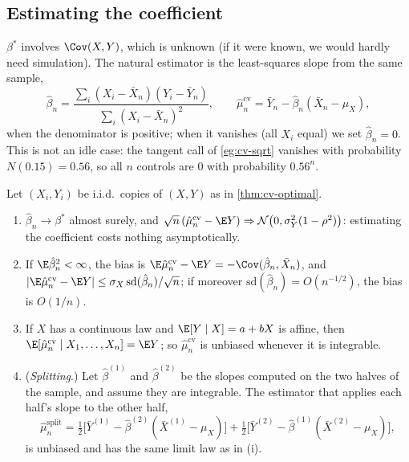 \subsection{Estimating the coefficient}

$\beta^*$ involves $\Cov(X,Y)$, which is unknown (if it were known, we would hardly need
simulation). The natural estimator is the least-squares slope from the same sample,
\[
  \hat\beta_n=\frac{\sum_i(X_i-\bar X_n)(Y_i-\bar Y_n)}{\sum_i(X_i-\bar X_n)^2},\qquad
  \hat\mu^{\mathrm{cv}}_n=\bar Y_n-\hat\beta_n(\bar X_n-\mu_X),
\]
when the denominator is positive; when it vanishes (all $X_i$ equal) we set $\hat\beta_n=0$.
This is not an idle case: the tangent call of \cref{eg:cv-sqrt} vanishes with probability
$N(0.15)=0.56$, so all $n$ controls are $0$ with probability $0.56^n$.

\begin{proposition}\label{prop:cv-estimated-beta}
Let $(X_i,Y_i)$ be i.i.d.\ copies of $(X,Y)$ as in \cref{thm:cv-optimal}.
\begin{enumerate}[label=(\roman*)]
  \item $\hat\beta_n\to\beta^*$ almost surely, and
    $\sqrt n\,(\hat\mu^{\mathrm{cv}}_n-\E Y)\Rightarrow\mathcal N\big(0,\sigma_Y^2(1-\rho^2)\big)$:
    estimating the coefficient costs nothing asymptotically.
  \item If $\E\hat\beta_n^2<\infty$, the bias is
    $\E\hat\mu^{\mathrm{cv}}_n-\E Y=-\Cov(\hat\beta_n,\bar X_n)$, and
    $|\E\hat\mu^{\mathrm{cv}}_n-\E Y|\le\sigma_X\,\mathrm{sd}(\hat\beta_n)/\sqrt n$; if moreover
    $\mathrm{sd}(\hat\beta_n)=O(n^{-1/2})$, the bias is $O(1/n)$.
  \item If $X$ has a continuous law and $\E[Y\mid X]=a+bX$ is affine, then
    $\E[\hat\mu^{\mathrm{cv}}_n\mid X_1,\dots,X_n]=\E Y$; so $\hat\mu^{\mathrm{cv}}_n$ is unbiased
    whenever it is integrable.
  \item (\emph{Splitting}.) Let $\hat\beta^{(1)}$ and $\hat\beta^{(2)}$ be the slopes computed
    on the two halves of the sample, and assume they are integrable. The estimator that
    applies each half's slope to the other half,
    \[
      \hat\mu^{\mathrm{split}}_n=\tfrac12\Big[\bar Y^{(1)}-\hat\beta^{(2)}(\bar X^{(1)}-\mu_X)\Big]
      +\tfrac12\Big[\bar Y^{(2)}-\hat\beta^{(1)}(\bar X^{(2)}-\mu_X)\Big],
    \]
    is unbiased and has the same limit law as in (i).
\end{enumerate}
\end{proposition}

